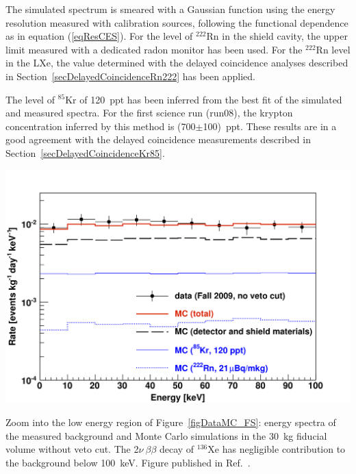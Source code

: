 The simulated spectrum is smeared with a Gaussian function using the energy resolution measured with calibration sources, following the functional dependence as in equation (\ref{eqResCES}).
For the level of $^{222}$Rn in the shield cavity, the upper limit measured with a dedicated radon monitor has been used. For the $^{222}$Rn level in the LXe, the value determined with the delayed coincidence analyses described in Section~\ref{secDelayedCoincidenceRn222} has been applied.

The level of $^{85}$Kr of 120~ppt has been inferred from the best fit of the simulated and measured spectra. For the first science run (run08), the krypton concentration inferred by this method is (700$\pm$100)~ppt. These results are in a good agreement with the delayed coincidence measurements described in Section~\ref{secDelayedCoincidenceKr85}. 

\begin{floatingfigure}[lh]{0.475\textwidth}
\centering
\includegraphics[width=0.475\linewidth]{plots/DataMC/dataMC_30kg_PassiveVeto_WS2.png}
\caption[Low energy region of the measured and simulated background spectra]{Zoom into the low energy region of Figure~\ref{figDataMC_FS}: energy spectra of the measured background and Monte Carlo simulations in the 30~kg fiducial volume without veto cut. The  2$\nu~\beta\beta$ decay of $^{136}$Xe has negligible contribution to the background below 100~keV. Figure published in Ref.~\cite{EMBG}.}
\label{figDataMC_WS}
\end{floatingfigure}

